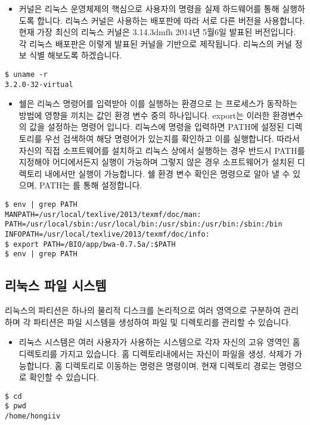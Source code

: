 \documentclass{article}
\begin{document}
\begin{itemize}
\item
  \begin{itemize}
  커널은 리눅스 운영체제의 핵심으로 사용자의 명령을 실제 하드웨어를 통해 실행하도록 합니다. 리눅스 커널은 사용하는 배포판에 따라 서로 다른 버전을 사용합니다. 현재 가장 최신의 리눅스 커널은 3.14.3dmfh 2014년 5월6일 발표된 버전입니다. 각 리눅스 배포판은 이렇게 발표된 커널을 기반으로 제작됩니다. 리눅스의 커널 정보 식별 해보도록 하겠습니다. 
  \end{itemize}
\end{itemize}
\begin{lstlisting}[frame=single,style=Bash,xleftmargin=1.4cm,xrightmargin=1.4cm]
$ uname -r
3.2.0-32-virtual
\end{lstlisting}

\begin{itemize}
\item
  \begin{itemize}
  쉘은 리눅스 명령어를 입력받아 이를 실행하는 환경으로 는 프로세스가 동작하는 방법에 영향을 끼치는 값인 환경 변수 중의 하나입니다. export는 이러한 환경변수의 값을 설정하는 명령어 입니다. 리눅스에 명령을 입력하면 PATH에 설정된 디렉토리를 우선 검색하여 해당 명령어가 있는지를 확인하고 이를 실행합니다. 따라서 자신의 직접 소프트웨어를 설치하고 리눅스 상에서 실행하는 경우 반드시 PATH를 지정해야 어디에서든지 실행이 가능하며 그렇지 않은 경우 소프트웨어가 설치된 디렉토리 내에서만 실행이 가능합니다. 쉘 환경 변수 확인은  명령으로 알아 낼 수 있으며, PATH는 를 통해 설정합니다.
  \end{itemize}
\end{itemize}
\begin{lstlisting}[frame=single,style=Bash,xleftmargin=1.4cm,xrightmargin=1.4cm]
$ env | grep PATH
MANPATH=/usr/local/texlive/2013/texmf/doc/man:
PATH=/usr/local/sbin:/usr/local/bin:/usr/sbin:/usr/bin:/sbin:/bin
INFOPATH=/usr/local/texlive/2013/texmf/doc/info:
$ export PATH=/BIO/app/bwa-0.7.5a/:$PATH
$ env | grep PATH
\end{lstlisting}


\subsection{리눅스 파일 시스템}
리눅스의 파티션은 하나의 물리적 디스크를 논리적으로 여러 영역으로 구분하여 관리하며 각 파티션은 파일 시스템을 생성하여 파일 및 디렉토리를 관리할 수 있습니다.

\begin{itemize}
\item
  \begin{itemize}
  리눅스 시스템은 여러 사용자가 사용하는 시스템으로 각자 자신의 고유 영역인 홈디렉토리를 가지고 있습니다. 홈 디렉토리내에서는 자신이 파일을 생성, 삭제가 가능합니다. 홈 디렉토리로 이동하는 명령은  명령이며, 현재 디렉토리 경로는  명령으로 확인할 수 있습니다.
  \end{itemize}
\end{itemize}
\begin{lstlisting}[frame=single,style=Bash,xleftmargin=1.4cm,xrightmargin=1.4cm]
$ cd
$ pwd
/home/hongiiv
\end{lstlisting}
\end{document}
